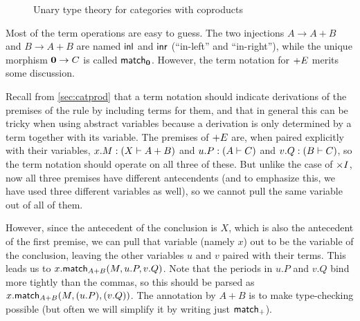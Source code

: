 \begin{figure}
  \centering
  \caption{Unary type theory for categories with coproducts}
  \label{fig:catcoprod}
\end{figure}

Most of the term operations are easy to guess.
The two injections $A\to A+B$ and $B\to A+B$ are named $\mathsf{inl}$ and $\mathsf{inr}$ (``in-left'' and ``in-right''), while the unique morphism $\mathbf{0} \to C$ is called $\mathsf{match}_{\mathbf{0}}$.
However, the term notation for $\mathord{+}E$ merits some discussion.

Recall from \cref{sec:catprod} that a term notation should indicate derivations of the premises of the rule by including terms for them, and that in general this can be tricky when using abstract variables because a derivation is only determined by a term together with its variable.
The premises of $\mathord{+}E$ are, when paired explicitly with their variables, $x.M:(X\vdash A+B)$ and $u.P:(A\vdash C)$ and $v.Q:(B\vdash C)$, so the term notation should operate on all three of these.
But unlike the case of $\timesI$, now all three premises have different antecendents (and to emphasize this, we have used three different variables as well), so we cannot pull the same variable out of all of them.

However, since the antecedent of the conclusion is $X$, which is also the antecedent of the first premise, we can pull that variable (namely $x$) out to be the variable of the conclusion, leaving the other variables $u$ and $v$ paired with their terms.
This leads us to $x.\mathsf{match}_{A+B}(M,u.P,v.Q)$.
Note that the periods in $u.P$ and $v.Q$ bind more tightly than the commas, so this should be parsed as $x.\mathsf{match}_{A+B}(M,(u.P),(v.Q))$.
The annotation by $A+B$ is to make type-checking possible (but often we will simplify it by writing just $\mathsf{match}_+$).

